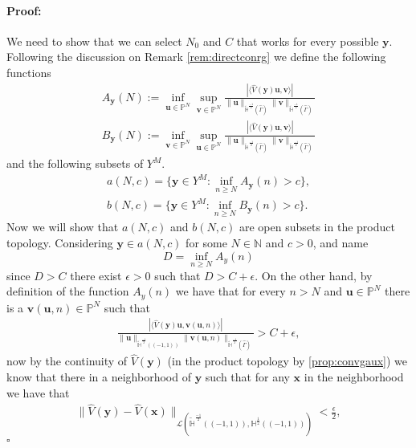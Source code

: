 \documentclass{article}
\newenvironment{proof}{\paragraph{Proof:}}{\hfill$\square$}
\newcommand{\IN}{{\mathbb N}}
\begin{document}
\begin{proof}
We need to show that we can select $N_0$ and $C$ that works for every possible $\mathbf{y}$. Following the discussion on Remark \ref{rem:directconrg} we define the following
functions 
\begin{align*}
A_\mathbf{y}(N)  := \inf_{\mathbf{u} \in \mathbb{P}^N} \sup_{\mathbf{v} \in\mathbb{P}^N } \frac{|\langle \widehat{V}(\mathbf{y}) \mathbf{u} , \mathbf{v} \rangle|}{\| \mathbf{u} \|_{\widetilde{\mathbb{H}}^{\frac{-1}{2}}(\widehat{\Gamma})}
\|\mathbf{v} \|_{\widetilde{\mathbb{H}}^{\frac{-1}{2}}(\widehat{\Gamma})} } \\ 
B_\mathbf{y}(N)  := \inf_{\mathbf{v} \in \mathbb{P}^N} \sup_{\mathbf{u} \in\mathbb{P}^N } \frac{|\langle \widehat{V}(\mathbf{y}) \mathbf{u} , \mathbf{v} \rangle|}{\| \mathbf{u} \|_{\widetilde{\mathbb{H}}^{\frac{-1}{2}}(\widehat{\Gamma})}
\|\mathbf{v} \|_{\widetilde{\mathbb{H}}^{\frac{-1}{2}}(\widehat{\Gamma})} } 
\end{align*}
and the following subsets of $Y^M$. 
\begin{align*}
a(N,c) = \{ \mathbf{y} \in Y^M : \inf_{n \geq N} A_\mathbf{y}(n) > c \} , \\
b(N,c) = \{ \mathbf{y} \in Y^M : \inf_{n \geq N} B_\mathbf{y}(n) > c \} . 
\end{align*}
Now we will show that $a(N,c)$ and $b(N,c)$ are open subsets in the product topology. Considering $\mathbf{y} \in a(N,c)$ for some $N \in \IN$ and $c >0$, and name 
$$D = \inf_{n\geq N}A_y(n) $$
since $D>C$ there exist $\epsilon >0$ such that $D > C+ \epsilon$. On the other hand, by definition of the function $A_y(n)$ we have that for every $n >N$ and $\mathbf{u} \in \mathbb{P}^N$ there is a $\mathbf{v}(\mathbf{u},n) \in \mathbb{P}^N$ such that 
\begin{align*}
\frac{|\langle \widehat{V}(\mathbf{y}) \mathbf{u} , \mathbf{v}(\mathbf{u},n) \rangle|}{\| \mathbf{u} \|_{\widetilde{\mathbb{H}}^{\frac{-1}{2}}((-1,1))}
\|\mathbf{v}(\mathbf{u},n) \|_{\widetilde{\mathbb{H}}^{\frac{-1}{2}}(\widehat{\Gamma})} } > C + \epsilon,
\end{align*}
now by the continuity of $\widehat{V}(\mathbf{y})$ (in the product topology by \ref{prop:convgaux}) we know that there in a neighborhood of $\mathbf{y}$ such that for any $\mathbf{x}$ in the neighborhood  we have that 
\begin{align*}
\| \widehat{V}(\mathbf{y})- \widehat{V}(\mathbf{x}) \|_{\mathcal{L}(\widetilde{\mathbb{H}}^{\frac{-1}{2}}((-1,1)),{\mathbb{H}}^{\frac{1}{2}}((-1,1)))} < \frac{\epsilon}{2},

\end{align*}
\end{proof}
\end{document}
